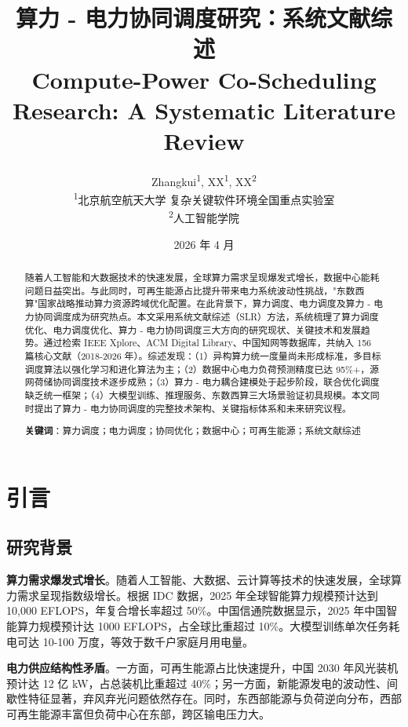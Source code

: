 \documentclass[12pt,a4paper]{article}
\title{\textbf{算力 - 电力协同调度研究：系统文献综述}\\[0.5em]
\large Compute-Power Co-Scheduling Research: A Systematic Literature Review}
\author{Zhangkui\textsuperscript{1}, XX\textsuperscript{1}, XX\textsuperscript{2}\\[0.5em]
\textsuperscript{1}北京航空航天大学 复杂关键软件环境全国重点实验室\\
\textsuperscript{2}人工智能学院}
\date{2026 年 4 月}
\begin{document}
\maketitle

\begin{abstract}
随着人工智能和大数据技术的快速发展，全球算力需求呈现爆发式增长，数据中心能耗问题日益突出。与此同时，可再生能源占比提升带来电力系统波动性挑战，"东数西算"国家战略推动算力资源跨域优化配置。在此背景下，算力调度、电力调度及算力 - 电力协同调度成为研究热点。本文采用系统文献综述（SLR）方法，系统梳理了算力调度优化、电力调度优化、算力 - 电力协同调度三大方向的研究现状、关键技术和发展趋势。通过检索 IEEE Xplore、ACM Digital Library、中国知网等数据库，共纳入 156 篇核心文献（2018-2026 年）。综述发现：（1）异构算力统一度量尚未形成标准，多目标调度算法以强化学习和进化算法为主；（2）数据中心电力负荷预测精度已达 95\%+，源网荷储协同调度技术逐步成熟；（3）算力 - 电力耦合建模处于起步阶段，联合优化调度缺乏统一框架；（4）大模型训练、推理服务、东数西算三大场景验证初具规模。本文同时提出了算力 - 电力协同调度的完整技术架构、关键指标体系和未来研究议程。

\vspace{1em}
\noindent\textbf{关键词}：算力调度；电力调度；协同优化；数据中心；可再生能源；系统文献综述
\end{abstract}

\tableofcontents
\newpage

\section{引言}
\label{sec:intro}

\subsection{研究背景}

\textbf{算力需求爆发式增长}。随着人工智能、大数据、云计算等技术的快速发展，全球算力需求呈现指数级增长。根据 IDC 数据，2025 年全球智能算力规模预计达到 10,000 EFLOPS，年复合增长率超过 50\%\cite{idc2024worldwide}。中国信通院数据显示，2025 年中国智能算力规模预计达 1000 EFLOPS，占全球比重超过 10\%\cite{caict2024compute}。大模型训练单次任务耗电可达 10-100 万度，等效于数千户家庭月用电量。

\textbf{电力供应结构性矛盾}。一方面，可再生能源占比快速提升，中国 2030 年风光装机预计达 12 亿 kW，占总装机比重超过 40\%；另一方面，新能源发电的波动性、间歇性特征显著，弃风弃光问题依然存在。同时，东西部能源与负荷逆向分布，西部可再生能源丰富但负荷中心在东部，跨区输电压力大\cite{iea2023data}。
\end{document}

